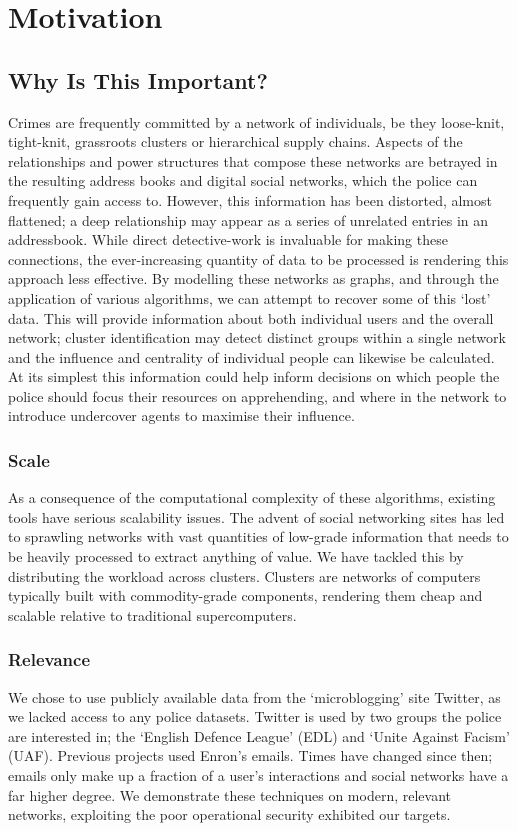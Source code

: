 \chapter{Motivation}

\section{Why Is This Important?}
Crimes are frequently committed by a network of individuals, be they loose-knit,
tight-knit, grassroots clusters or hierarchical supply chains. Aspects of the
relationships and power structures that compose these networks are betrayed in
the resulting address books and digital social networks, which the police can
frequently gain access to. However, this information has been distorted, almost
flattened; a deep relationship may appear as a series of unrelated entries in an
addressbook. While direct detective-work is invaluable for making these
connections, the ever-increasing quantity of data to be processed is rendering
this approach less effective. By modelling these networks as graphs, and
through the application of various algorithms, we can attempt to recover some of
this `lost' data. This will provide information about both individual users and
the overall network; cluster identification may detect distinct groups within a
single network and the influence and centrality of individual people can
likewise be calculated. At its simplest this information could help inform
decisions on which people the police should focus their resources on
apprehending, and where in the network to introduce undercover agents to
maximise their influence. 

\subsection{Scale}
As a consequence of the computational complexity of these algorithms, existing tools have
serious scalability issues. The advent of social networking sites has led to
sprawling networks with vast quantities of low-grade information that needs to
be heavily processed to extract anything of value. We have tackled this by
distributing the workload across clusters. Clusters are networks of computers
typically built with commodity-grade components, rendering them cheap and
scalable relative to traditional supercomputers.

\subsection{Relevance}
We chose to use publicly available data from the `microblogging' site Twitter, 
as we lacked access to any police datasets. Twitter is used by two groups the police
are interested in; the `English Defence League' (EDL) and `Unite Against Facism'
(UAF). Previous projects used Enron's emails. Times have changed since then;
emails only make up a fraction of a user's interactions and social networks have
a far higher degree. We demonstrate these techniques on modern, relevant
networks, exploiting the poor operational security exhibited our targets.


